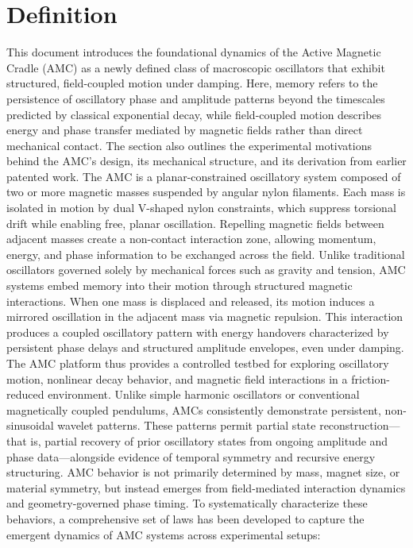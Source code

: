 \documentclass[10pt,aps,pre,onecolumn,superscriptaddress,notitlepage]{revtex4-2}
\begin{document}
\maketitle

\section*{Definition}
\label{sec:def}

This document introduces the foundational dynamics of the Active Magnetic Cradle (AMC) as a newly defined class of macroscopic oscillators that exhibit structured, field-coupled motion under damping. Here, memory refers to the persistence of oscillatory phase and amplitude patterns beyond the timescales predicted by classical exponential decay, while field-coupled motion describes energy and phase transfer mediated by magnetic fields rather than direct mechanical contact. The section also outlines the experimental motivations behind the AMC’s design, its mechanical structure, and its derivation from earlier patented work.
The AMC is a planar-constrained oscillatory system composed of two or more magnetic masses suspended by angular nylon filaments. Each mass is isolated in motion by dual V-shaped nylon constraints, which suppress torsional drift while enabling free, planar oscillation. Repelling magnetic fields between adjacent masses create a non-contact interaction zone, allowing momentum, energy, and phase information to be exchanged across the field.
Unlike traditional oscillators governed solely by mechanical forces such as gravity and tension, AMC systems embed memory into their motion through structured magnetic interactions. When one mass is displaced and released, its motion induces a mirrored oscillation in the adjacent mass via magnetic repulsion. This interaction produces a coupled oscillatory pattern with energy handovers characterized by persistent phase delays and structured amplitude envelopes, even under damping.
The AMC platform thus provides a controlled testbed for exploring oscillatory motion, nonlinear decay behavior, and magnetic field interactions in a friction-reduced environment. Unlike simple harmonic oscillators or conventional magnetically coupled pendulums, AMCs consistently demonstrate persistent, non-sinusoidal wavelet patterns. These patterns permit partial state reconstruction—that is, partial recovery of prior oscillatory states from ongoing amplitude and phase data—alongside evidence of temporal symmetry and recursive energy structuring.
AMC behavior is not primarily determined by mass, magnet size, or material symmetry, but instead emerges from field-mediated interaction dynamics and geometry-governed phase timing. To systematically characterize these behaviors, a comprehensive set of laws has been developed to capture the emergent dynamics of AMC systems across experimental setups:
\end{document}
